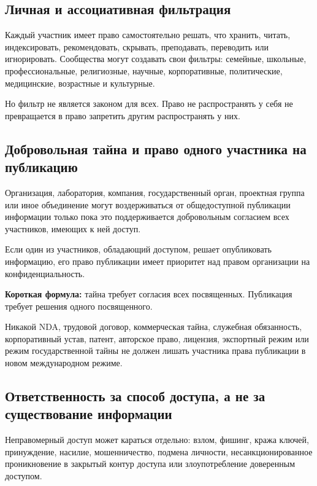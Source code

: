 \documentclass[11pt,a4paper]{article}
\begin{document}
\subsection{Личная и ассоциативная фильтрация}

Каждый участник имеет право самостоятельно решать, что хранить, читать, индексировать, рекомендовать, скрывать, преподавать, переводить или игнорировать. Сообщества могут создавать свои фильтры: семейные, школьные, профессиональные, религиозные, научные, корпоративные, политические, медицинские, возрастные и культурные.

Но фильтр не является законом для всех. Право не распространять у себя не превращается в право запретить другим распространять у них.

\subsection{Добровольная тайна и право одного участника на публикацию}

Организация, лаборатория, компания, государственный орган, проектная группа или иное объединение могут воздерживаться от общедоступной публикации информации только пока это поддерживается добровольным согласием всех участников, имеющих к ней доступ.

Если один из участников, обладающий доступом, решает опубликовать информацию, его право публикации имеет приоритет над правом организации на конфиденциальность.

\begin{executivebox}
\textbf{Короткая формула:} тайна требует согласия всех посвященных. Публикация требует решения одного посвященного.
\end{executivebox}

Никакой NDA, трудовой договор, коммерческая тайна, служебная обязанность, корпоративный устав, патент, авторское право, лицензия, экспортный режим или режим государственной тайны не должен лишать участника права публикации в новом международном режиме.

\subsection{Ответственность за способ доступа, а не за существование информации}

Неправомерный доступ может караться отдельно: взлом, фишинг, кража ключей, принуждение, насилие, мошенничество, подмена личности, несанкционированное проникновение в закрытый контур доступа или злоупотребление доверенным доступом.
\end{document}
